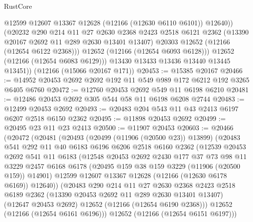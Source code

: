 \begin{lexlean}{RustCore}
\begin{coremodule}
                @12599
                @12607
                @13367
                @12628
                (@12166 (@12630 @6110 @6101))
                @12640))
            (@20232
              @290
              @214
              @11
              @27
              @2630
              @2368
              @2423
              @2518
              @6121
              @2362
              (@13390 @20167 @2692 @11 @289 @2630 @13401 @13407)
              @20303
              @12652
              (@12166 (@12654 @6122 @2368)))
            @12652
            (@12166 (@12654 @6093 @6128)))
          @12652
          (@12166 (@12654 @6083 @6129)))
        @13430
        @13433
        @13436
        @13440
        @13445
        @13451))
    (@12166 (@15066 @20167 @171))
@20453 := @15385 @20167
@20466 := @14952 @20453 @2692 @2692 @192 @11 @549 @989 @172 @6212 @192 @3265 @6405 @6760
@20472 := @12760 @20453 @2692 @549 @11 @6198 @6210
@20481 := @12486 @20453 @2692 @305 @544 @58 @11 @6198 @6208 @2744
@20483 := @12499 @20453 @2692
@20493 := @20483 @204 @543 @11 @43 @2413 @6197 @6207 @2518 @6150 @2362
@20495 := @11898 @20453 @2692
@20499 := @20495 @23 @11 @23 @2413
@20500 := @11907 @20453
@20603 := @20466
    (@20472
      (@20481
        (@20493
          (@20499 (@11906 (@20500 @23)) @13899)
          (@20483
            @541
            @292
            @11
            @40
            @6183
            @6196
            @6206
            @2518
            @6160
            @2362
            (@12539
              @20453
              @2692
              @541
              @11
              @6183
              (@12548
                @20453
                @2692
                @2430
                @177
                @37
                @73
                @98
                @11
                @3229
                @2457
                @6168
                @6178
                (@20495 @159 @38 @159 @3229 (@11906 (@20500 @159)) @14901)
                @12599
                @12607
                @13367
                @12628
                (@12166 (@12630 @6178 @6169))
                @12640))
            (@20483
              @290
              @214
              @11
              @27
              @2630
              @2368
              @2423
              @2518
              @6189
              @2362
              (@13390 @20453 @2692 @11 @289 @2630 @13401 @13407)
              (@12647 @20453 @2692)
              @12652
              (@12166 (@12654 @6190 @2368)))
            @12652
            (@12166 (@12654 @6161 @6196)))
          @12652
          (@12166 (@12654 @6151 @6197)))

\end{coremodule}
\end{lexlean}
